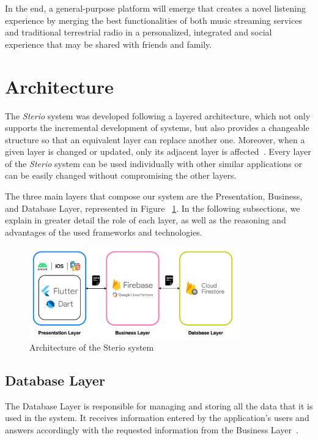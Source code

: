 In the end, a general-purpose platform will emerge that creates a novel listening experience by merging the best functionalities of both music streaming services and traditional terrestrial radio in a personalized, integrated and social experience that may be shared with friends and family.




\section{Architecture}

The \textit{Sterio} system was developed following a layered architecture, which not only supports the incremental development of systems, but also provides a changeable structure so that an equivalent layer can replace another one. Moreover, when a given layer is changed or updated, only its adjacent layer is affected~\cite{Aarsten}. Every layer of the \textit{Sterio} system can be used individually with other similar applications or can be easily changed without compromising the other layers. 

The three main layers that compose our system are the Presentation, Business, and Database Layer, represented in Figure ~\ref{fig:arc}. In the following subsections, we explain in greater detail the role of each layer, as well as the reasoning and advantages of the used frameworks and technologies. 

\begin{figure}[h]
\centering
\includegraphics[width=0.8\textwidth]{./Images/arc.png}
\caption{Architecture of the Sterio system}
\label{fig:arc}
\end{figure}

\subsection{Database Layer}

The Database Layer is responsible for managing and storing all the data that it is used in the system. It receives information entered by the application's users and answers accordingly with the requested information from the Business Layer~\cite{Aarsten}. 

